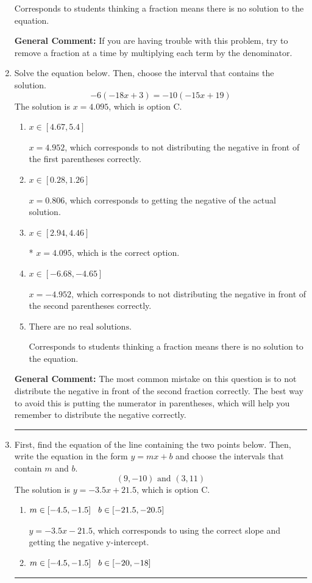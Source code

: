 \documentclass{extbook}[14pt]
\newcommand{\litem}[1]{\item #1

\rule{\textwidth}{0.4pt}}
\begin{document}
\begin{enumerate}
{\begin{enumerate}[label=\Alph*.]
Corresponds to students thinking a fraction means there is no solution to the equation.
\end{enumerate}

\textbf{General Comment:} If you are having trouble with this problem, try to remove a fraction at a time by multiplying each term by the denominator.
}
\litem{
Solve the equation below. Then, choose the interval that contains the solution.
\[ -6(-18x + 3) = -10(-15x + 19) \]The solution is \( x = 4.095 \), which is option C.\begin{enumerate}[label=\Alph*.]
\item \( x \in [4.67, 5.4] \)

$x = 4.952$, which corresponds to not distributing the negative in front of the first parentheses correctly.
\item \( x \in [0.28, 1.26] \)

$x = 0.806$, which corresponds to getting the negative of the actual solution.
\item \( x \in [2.94, 4.46] \)

* $x = 4.095$, which is the correct option.
\item \( x \in [-6.68, -4.65] \)

$x = -4.952$, which corresponds to not distributing the negative in front of the second parentheses correctly.
\item \( \text{There are no real solutions.} \)

Corresponds to students thinking a fraction means there is no solution to the equation.
\end{enumerate}

\textbf{General Comment:} The most common mistake on this question is to not distribute the negative in front of the second fraction correctly. The best way to avoid this is putting the numerator in parentheses, which will help you remember to distribute the negative correctly.
}
\litem{
First, find the equation of the line containing the two points below. Then, write the equation in the form $ y=mx+b $ and choose the intervals that contain $m$ and $b$.
\[ (9, -10) \text{ and } (3, 11) \]The solution is \( y = -3.5x + 21.5 \), which is option C.\begin{enumerate}[label=\Alph*.]
\item \( m \in [-4.5, -1.5] \hspace*{3mm} b \in [-21.5, -20.5] \)

 $y = -3.5x -21.5$, which corresponds to using the correct slope and getting the negative y-intercept.
\item \( m \in [-4.5, -1.5] \hspace*{3mm} b \in [-20, -18] \)


\end{enumerate}}
\end{enumerate}
\end{document}
